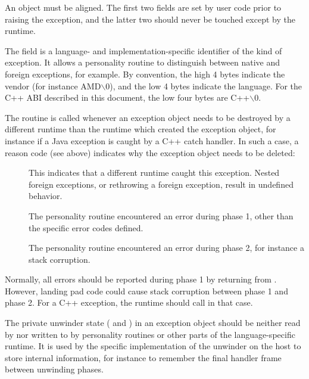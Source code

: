 An  object must be \eightbyte aligned.  The first
two fields are set by user code prior to raising the exception, and the
latter two should never be touched except by the runtime.

The  field is a language- and implementation-specific
identifier of the kind of exception. It allows a personality routine
to distinguish between native and foreign exceptions, for example.
By convention, the high 4 bytes indicate the vendor (for instance
AMD$\backslash$0), and the low 4 bytes indicate the language.  For the C++
ABI described in this document, the low four bytes are C++$\backslash$0.

The  routine is called whenever an exception object
needs to be destroyed by a different runtime than the runtime
which created the exception object, for instance if a Java exception
is caught by a C++ catch handler. In such a case, a reason code (see
above) indicates why the exception object needs to be deleted:

\begin{description}
\item[] This indicates that a
     different runtime caught this exception. Nested foreign exceptions,
     or rethrowing a foreign exception, result in undefined behavior.

\item[] The personality routine encountered
     an error during phase 1, other than the specific error codes defined.

\item[] The personality routine
  encountered an error during phase 2, for instance a stack corruption.
\end{description}

Normally, all errors should be reported during phase 1 by returning
from . However, landing pad code could cause
stack corruption between phase 1 and phase 2. For a C++ exception,
the runtime should call  in that case.

The private unwinder state ( and ) in an exception
object should be neither read by nor written to by personality routines or
other parts of the language-specific runtime.  It is used by the specific
implementation of the unwinder on the host to store internal information,
for instance to remember the final handler frame between unwinding phases.

